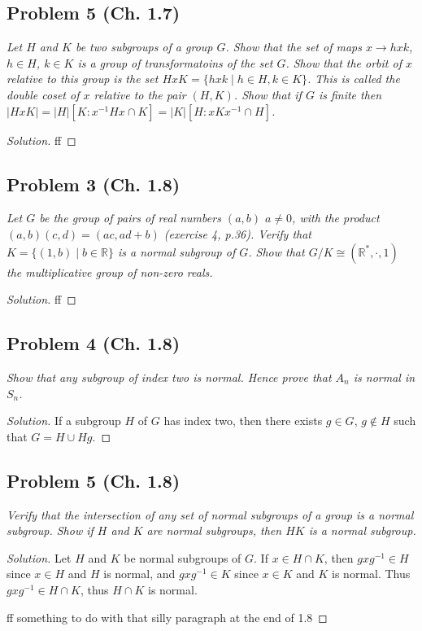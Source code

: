 \documentclass{article}
\newcommand{\R}{{\mathbb R}}
\begin{document}
\subsection*{Problem 5 (Ch. 1.7)}
{\it Let $H$ and $K$ be two subgroups of a group $G$.
Show that the set of maps $x \to hxk$, $h \in H$, $k \in K$
is a group of transformatoins of the set $G$.
Show that the orbit of $x$ relative to this group
is the set $HxK = \{hxk \mid h\in H, k\in K\}$.
This is called the \emph{double coset of $x$ relative to the pair $(H,K)$}.
Show that if $G$ is finite then $|HxK| = |H|[K \colon x^{-1}Hx\cap K]
= |K|[H\colon xKx^{-1} \cap H]$.}
\begin{proof}[Solution]\let\qed\relax
	ff
\end{proof}

\subsection*{Problem 3 (Ch. 1.8)}
{\it Let $G$ be the group of pairs of real numbers $(a,b)$ $a\neq0$,
with the product $(a,b)(c,d) = (ac,ad+b)$ (exercise 4, p.36).
Verify that $K = \{(1,b)\mid b\in\R\}$ is a normal subgroup of $G$.
Show that $G/K \cong (\R^*,\cdot,1)$ the multiplicative group of non-zero reals.}
\begin{proof}[Solution]\let\qed\relax
	ff
\end{proof}

\subsection*{Problem 4 (Ch. 1.8)}
{\it Show that any subgroup of index two is normal.
Hence prove that $A_n$ is normal in $S_n$.}
\begin{proof}[Solution]\let\qed\relax
	If a subgroup $H$ of $G$ has index two,
	then there exists $g \in G$, $g \not\in H$
	such that $G = H \cup Hg$.
\end{proof}

\subsection*{Problem 5 (Ch. 1.8)}
{\it Verify that the intersection of any set of normal subgroups
of a group is a normal subgroup.
Show if $H$ and $K$ are normal subgroups,
then $HK$ is a normal subgroup.}
\begin{proof}[Solution]\let\qed\relax
	Let $H$ and $K$ be normal subgroups of $G$.
	If $x \in H \cap K$,
	then $gxg^{-1} \in H$ since $x \in H$ and $H$ is normal,
	and $gxg^{-1} \in K$ since $x \in K$ and $K$ is normal.
	Thus $gxg^{-1} \in H \cap K$, thus $H \cap K$ is normal.

	ff something to do with that silly paragraph at the end of 1.8
\end{proof}
\end{document}

